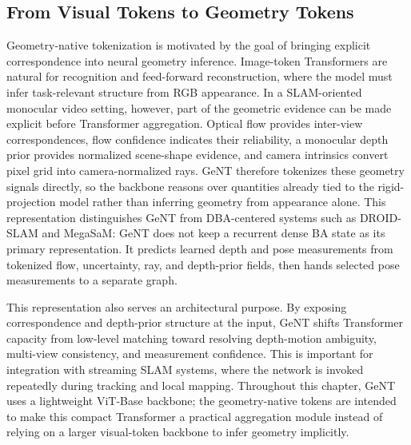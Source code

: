 \subsection{From Visual Tokens to Geometry Tokens}
Geometry-native tokenization is motivated by the goal of bringing explicit correspondence into neural geometry inference.
Image-token Transformers are natural for recognition and feed-forward reconstruction, where the model must infer task-relevant structure from RGB appearance.
In a SLAM-oriented monocular video setting, however, part of the geometric evidence can be made explicit before Transformer aggregation.
Optical flow provides inter-view correspondences, flow confidence indicates their reliability, a monocular depth prior provides normalized scene-shape evidence, and camera intrinsics convert pixel grid into camera-normalized rays.
GeNT therefore tokenizes these geometry signals directly, so the backbone reasons over quantities already tied to the rigid-projection model rather than inferring geometry from appearance alone.
This representation distinguishes GeNT from DBA-centered systems such as DROID-SLAM and MegaSaM: GeNT does not keep a recurrent dense BA state as its primary representation.
It predicts learned depth and pose measurements from tokenized flow, uncertainty, ray, and depth-prior fields, then hands selected pose measurements to a separate graph.

This representation also serves an architectural purpose.
By exposing correspondence and depth-prior structure at the input, GeNT shifts Transformer capacity from low-level matching toward resolving depth-motion ambiguity, multi-view consistency, and measurement confidence.
This is important for integration with streaming SLAM systems, where the network is invoked repeatedly during tracking and local mapping.
Throughout this chapter, GeNT uses a lightweight ViT-Base backbone; the geometry-native tokens are intended to make this compact Transformer a practical aggregation module instead of relying on a larger visual-token backbone to infer geometry implicitly.

